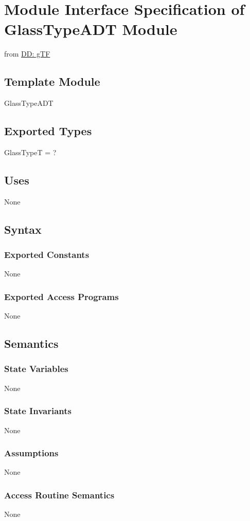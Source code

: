 \documentclass[12pt]{article}
\begin{document}
\section{Module Interface Specification of GlassTypeADT Module}
\label{Sec:GlassTypeADT}
from \hyperref[DD:gTF]{DD: gTF}
\subsection{Template Module}
\label{Sec:TemplateModule}
GlassTypeADT
\subsection{Exported Types}
\label{Sec:ExpTypes}
GlassTypeT = ?
\subsection{Uses}
\label{Sec:Uses}
None
\subsection{Syntax}
\label{Sec:Syntax}
\subsubsection{Exported Constants}
\label{Sec:ExpConstants}
None
\subsubsection{Exported Access Programs}
\label{Sec:ExpAccPrograms}
None
\subsection{Semantics}
\label{Sec:Semantics}
\subsubsection{State Variables}
\label{Sec:StateVars}
None
\subsubsection{State Invariants}
\label{Sec:StateInvars}
None
\subsubsection{Assumptions}
\label{Sec:Assumps}
None
\subsubsection{Access Routine Semantics}
\label{Sec:AccRoutSemantics}
None
\end{document}
